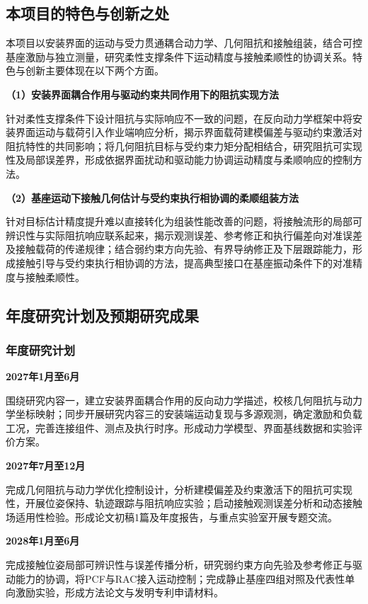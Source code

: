 \documentclass[UTF8,a4paper,zihao=-4,fontset=fandol]{ctexart}
\newcommand{\topic}[1]{\par\Needspace{4\baselineskip}\addvspace{0.5em}\noindent\textbf{#1}\par\nobreak}
\begin{document}
\subsection{本项目的特色与创新之处}

本项目以安装界面的运动与受力贯通耦合动力学、几何阻抗和接触组装，结合可控基座激励与独立测量，研究柔性支撑条件下运动精度与接触柔顺性的协调关系。特色与创新主要体现在以下两个方面。

\topic{（1）安装界面耦合作用与驱动约束共同作用下的阻抗实现方法}

针对柔性支撑条件下设计阻抗与实际响应不一致的问题，在反向动力学框架中将安装界面运动与载荷引入作业端响应分析，揭示界面载荷建模偏差与驱动约束激活对阻抗特性的共同影响；将几何阻抗目标与受约束力矩分配相结合，研究阻抗可实现性及局部误差界，形成依据界面扰动和驱动能力协调运动精度与柔顺响应的控制方法。

\topic{（2）基座运动下接触几何估计与受约束执行相协调的柔顺组装方法}

针对目标估计精度提升难以直接转化为组装性能改善的问题，将接触流形的局部可辨识性与实际阻抗响应联系起来，揭示观测误差、参考修正和执行偏差向对准误差及接触载荷的传递规律；结合弱约束方向先验、有界导纳修正及下层跟踪能力，形成接触引导与受约束执行相协调的方法，提高典型接口在基座振动条件下的对准精度与接触柔顺性。

\subsection{年度研究计划及预期研究成果}

\subsubsection{年度研究计划}

\topic{2027年1月至6月}
围绕研究内容一，建立安装界面耦合作用的反向动力学描述，校核几何阻抗与动力学坐标映射；同步开展研究内容三的安装端运动复现与多源观测，确定激励和负载工况，完善连接组件、测点及执行时序。形成动力学模型、界面基线数据和实验评价方案。

\topic{2027年7月至12月}
完成几何阻抗与动力学优化控制设计，分析建模偏差及约束激活下的阻抗可实现性，开展位姿保持、轨迹跟踪与阻抗响应实验；启动接触观测误差分析和动态接触场适用性检验。形成论文初稿1篇及年度报告，与重点实验室开展专题交流。

\topic{2028年1月至6月}
完成接触位姿局部可辨识性与误差传播分析，研究弱约束方向先验及参考修正与驱动能力的协调，将PCF与RAC接入运动控制；完成静止基座四组对照及代表性单向激励实验，形成方法论文与发明专利申请材料。
\end{document}
